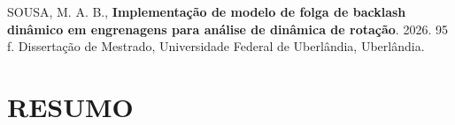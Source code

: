 
{
	\cleardoublepage
	\let\clearpage\relax
	\noindent	SOUSA, M. A. B., \textbf{Implementação de modelo de folga de backlash dinâmico em engrenagens para análise de dinâmica de rotação}. 2026. 95 f. Dissertação de Mestrado, Universidade Federal de Uberlândia, Uberlândia.
	
	\chapter*{\MakeUppercase{Resumo}}
}


